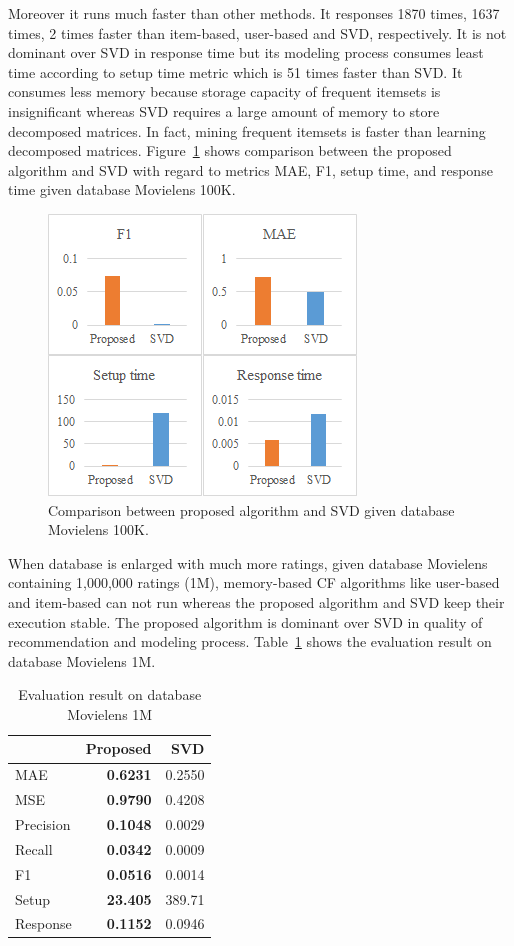 \documentclass[10pt]{article}
\begin{document}
Moreover it runs much faster than other methods. It responses 1870 times, 1637 times, 2 times faster than item-based, user-based and SVD, respectively. It is not dominant over SVD in response time but its modeling process consumes least time according to setup time metric which is 51 times faster than SVD. It consumes less memory because storage capacity of frequent itemsets is insignificant whereas SVD requires a large amount of memory to store decomposed matrices. In fact, mining frequent itemsets is faster than learning decomposed matrices. Figure~\ref{figure:comparison100k} shows comparison between the proposed algorithm and SVD with regard to metrics MAE, F1, setup time, and response time given database Movielens 100K.
\begin{figure}
\centering
\includegraphics{Comparison100K.png}
\caption{Comparison between proposed algorithm and SVD given database Movielens 100K.}
\label{figure:comparison100k}
\end{figure}

When database is enlarged with much more ratings, given database Movielens containing 1,000,000 ratings (1M), memory-based CF algorithms like user-based and item-based can not run whereas the proposed algorithm and SVD keep their execution stable. The proposed algorithm is dominant over SVD in quality of recommendation and modeling process. Table~\ref{table:evaluation.result.1M} shows the evaluation result on database Movielens 1M.
\begin{table}
\setlength{\tabcolsep}{4pt}
\centering
\caption{Evaluation result on database Movielens 1M}
\begin{tabular}{|l|r|r|} \hline
&\textbf{Proposed}&SVD\\ \hline
MAE&\textbf{0.6231}&0.2550\\ \hline
MSE&\textbf{0.9790}&0.4208\\ \hline
Precision&\textbf{0.1048}&0.0029\\ \hline
Recall&\textbf{0.0342}&0.0009\\ \hline
F1&\textbf{0.0516}&0.0014\\ \hline
Setup&\textbf{23.405}&389.71\\ \hline
Response&\textbf{0.1152}&0.0946\\ \hline
\end{tabular}
\label{table:evaluation.result.1M}
\end{table}
\end{document}
